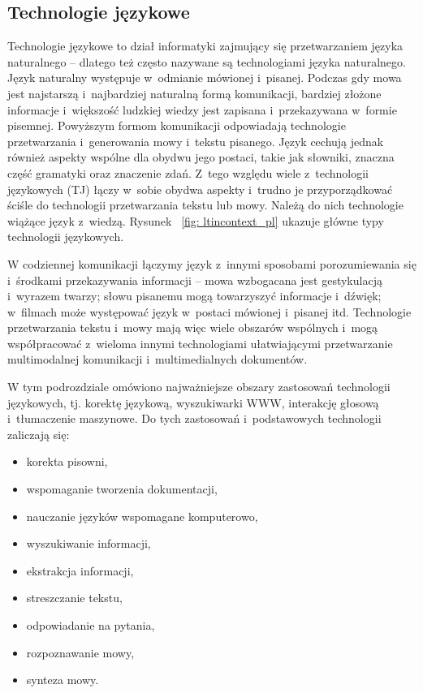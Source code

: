 \begin{multicols}{2} 

\subsection[Technologie językowe]{Technologie językowe} 

Technologie językowe to dział informatyki zajmujący się
przetwarzaniem języka naturalnego – dlatego też często nazywane
są technologiami języka naturalnego. Język naturalny występuje
w~odmianie mówionej i~pisanej. Podczas gdy mowa jest najstarszą
i~najbardziej naturalną formą komunikacji, bardziej złożone
informacje i~większość ludzkiej wiedzy jest zapisana i~przekazywana
w~formie pisemnej. Powyższym formom komunikacji odpowiadają
technologie przetwarzania i~generowania mowy i~tekstu pisanego. Język
cechują jednak również aspekty wspólne dla obydwu jego postaci,
takie jak słowniki, znaczna część gramatyki oraz znaczenie zdań.
Z~tego względu wiele z~technologii językowych (TJ) łączy w~sobie
obydwa aspekty i~trudno je przyporządkować ściśle do technologii
przetwarzania tekstu lub mowy. Należą do nich technologie wiążące
język z~wiedzą. Rysunek ~\ref{fig: ltincontext_pl} ukazuje główne
typy technologii językowych. 

W codziennej komunikacji łączymy język z~innymi sposobami
porozumiewania się i~środkami przekazywania informacji – mowa
wzbogacana jest gestykulacją i~wyrazem twarzy; słowu pisanemu mogą
towarzyszyć informacje i~dźwięk; w~filmach może występować
język w~postaci mówionej i~pisanej itd. Technologie przetwarzania
tekstu i~mowy mają więc wiele obszarów wspólnych i~mogą
współpracować z~wieloma innymi technologiami ułatwiającymi
przetwarzanie multimodalnej komunikacji i~multimedialnych dokumentów. 

W tym podrozdziale omówiono najważniejsze obszary zastosowań
technologii językowych, tj. korektę językową, wyszukiwarki WWW,
interakcję głosową i~tłumaczenie maszynowe. Do tych zastosowań
i~podstawowych technologii zaliczają się: \begin{itemize} \item
korekta pisowni, \item wspomaganie tworzenia dokumentacji, \item
nauczanie języków wspomagane komputerowo, \item wyszukiwanie
informacji, \item ekstrakcja informacji, \item streszczanie tekstu,
\item odpowiadanie na pytania, \item rozpoznawanie mowy, \item synteza
mowy. \end{itemize} 


\end{multicols}
